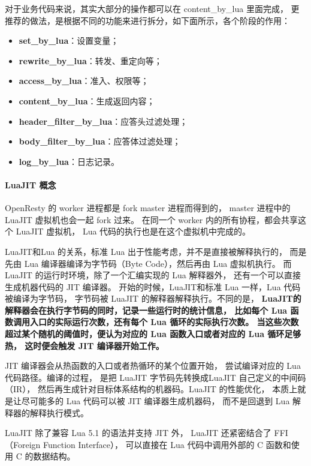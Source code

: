 \documentclass[a4,10pt]{ctexart}
\begin{document}
对于业务代码来说，其实大部分的操作都可以在 content\_by\_lua 里面完成，
更推荐的做法，是根据不同的功能来进行拆分，如下面所示，各个阶段的作用：
\begin{zy}
	\begin{itemize}[noitemsep]
		\item \textbf{set\_by\_lua}：设置变量；
		\item \textbf{rewrite\_by\_lua}：转发、重定向等；
		\item \textbf{access\_by\_lua}：准入、权限等；
		\item \textbf{content\_by\_lua}：生成返回内容；
		\item \textbf{header\_filter\_by\_lua}：应答头过滤处理；
		\item \textbf{body\_filter\_by\_lua}：应答体过滤处理；
		\item \textbf{log\_by\_lua}：日志记录。
	\end{itemize}
\end{zy}

\paragraph{LuaJIT 概念}

OpenResty 的 worker 进程都是 fork master 进程而得到的，
master 进程中的 LuaJIT 虚拟机也会一起 fork 过来。
在同一个 worker 内的所有协程，都会共享这个 LuaJIT 虚拟机，
Lua 代码的执行也是在这个虚拟机中完成的。

LuaJIT和Lua 的关系，标准 Lua 出于性能考虑，并不是直接被解释执行的，
而是先由 Lua 编译器编译为字节码（Byte Code），然后再由 Lua 虚拟机执行。
而 LuaJIT 的运行时环境，除了一个汇编实现的 Lua 解释器外，
还有一个可以直接生成机器代码的 JIT 编译器。
开始的时候，LuaJIT和标准 Lua 一样，Lua 代码被编译为字节码，
字节码被 LuaJIT 的解释器解释执行。不同的是，
\textbf{LuaJIT的解释器会在执行字节码的同时，记录一些运行时的统计信息，
比如每个 Lua 函数调用入口的实际运行次数，还有每个 Lua 循环的实际执行次数。
当这些次数超过某个随机的阈值时，便认为对应的 Lua 函数入口或者对应的 Lua 循环足够热，
这时便会触发 JIT 编译器开始工作。}

JIT 编译器会从热函数的入口或者热循环的某个位置开始，
尝试编译对应的 Lua 代码路径。编译的过程，
是把 LuaJIT 字节码先转换成LuaJIT 自己定义的中间码（IR），
然后再生成针对目标体系结构的机器码。LuaJIT 的性能优化，
本质上就是让尽可能多的 Lua 代码可以被 JIT 编译器生成机器码，
而不是回退到 Lua 解释器的解释执行模式。

LuaJIT 除了兼容 Lua 5.1 的语法并支持 JIT 外，
LuaJIT 还紧密结合了 FFI（Foreign Function Interface），
可以直接在 Lua 代码中调用外部的 C 函数和使用 C 的数据结构。
\end{document}
